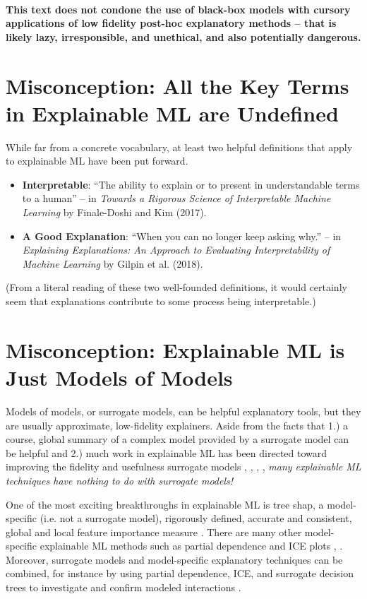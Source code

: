 \documentclass{article}
\begin{document}
\paragraph{This text does not condone the use of black-box models with cursory applications of low fidelity post-hoc explanatory methods -- that is likely lazy, irresponsible, and unethical, and also potentially dangerous.}

\section{Misconception: All the Key Terms in Explainable ML are Undefined}

While far from a concrete vocabulary, at least two helpful definitions that apply to explainable ML have been put forward.

\begin{itemize}
\item \textbf{Interpretable}: ``The ability to explain or to present in understandable terms to a human'' -- in \textit{Towards a Rigorous Science of Interpretable Machine Learning} by Finale-Doshi and Kim (2017).
\item \textbf{A Good Explanation}: ``When you can no longer keep asking why.'' -- in \textit{Explaining Explanations: An Approach to Evaluating Interpretability of Machine Learning} by Gilpin et al. (2018).
\end{itemize}

(From a literal reading of these two well-founded definitions, it would certainly seem that explanations contribute to some process being interpretable.)  

\section{Misconception: Explainable ML is Just Models of Models}

Models of models, or surrogate models, can be helpful explanatory tools, but they are usually approximate, low-fidelity explainers. Aside from the facts that 1.) a course, global summary of a complex model provided by a surrogate model can be helpful and 2.) much work in explainable ML has been directed toward improving the fidelity and usefulness surrogate models \citep{dt_surrogate1}, \cite{dt_surrogate2}, \cite{lime-sup}, \cite{wf_xnn}, \textit{many explainable ML techniques have nothing to do with surrogate models!}   

One of the most exciting breakthroughs in explainable ML is tree shap, a model-specific (i.e. not a surrogate model), rigorously defined, accurate and consistent, global and local feature importance measure \cite{tree_shap}. There are many other model-specific explainable ML methods such as partial dependence and ICE plots \cite{esl}, \cite{ice_plots}. Moreover, surrogate models and model-specific explanatory techniques can be combined, for instance by using partial dependence, ICE, and surrogate decision trees to investigate and confirm modeled interactions \cite{art_and_sci}. 
\end{document}
